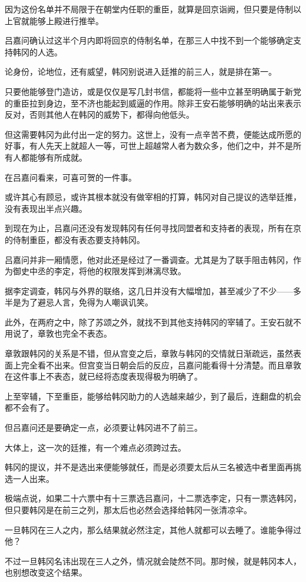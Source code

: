 因为这份名单并不局限于在朝堂内任职的重臣，就算是回京诣阙，但只要是侍制以上官就能够上殿进行推举。

吕嘉问确认过这半个月内即将回京的侍制名单，在那三人中找不到一个能够确定支持韩冈的人选。

论身份，论地位，还有威望，韩冈别说进入廷推的前三人，就是排在第一。

只要他能够登门造访，或是仅仅是写几封书信，都能将一些中立甚至明确属于新党的重臣拉到身边，至不济也能起到威逼的作用。除非王安石能够明确的站出来表示反对，否则其他人在韩冈的威势下，都得向他低头。

但这需要韩冈为此付出一定的努力。这世上，没有一点辛苦不费，便能达成所愿的好事，有人先天上就超人一等，可世上超越常人者为数众多，他们之中，并不是所有人都能够有所成就。

在吕嘉问看来，可喜可贺的一件事。

或许其心有顾忌，或许其根本就没有做宰相的打算，韩冈对自己提议的选举廷推，没有表现出半点兴趣。

到现在为止，吕嘉问还没有发现韩冈有任何寻找同盟者和支持者的表现，所有在京的侍制重臣，都没有表态要支持韩冈。

吕嘉问并非一厢情愿，他对此还是经过了一番调查。尤其是为了联手阻击韩冈，作为御史中丞的李定，将他的权限发挥到淋漓尽致。

据李定调查，韩冈与外界的联络，这几日并没有大幅增加，甚至减少了不少——多半是为了避忌人言，免得为人嘲讽讥笑。

此外，在两府之中，除了苏颂之外，就找不到其他支持韩冈的宰辅了。王安石就不用说了，章敦也完全不表态。

章敦跟韩冈的关系是不错，但从宫变之后，章敦与韩冈的交情就日渐疏远，虽然表面上完全看不出来。但宫变当日朝会后的反应，吕嘉问能看得十分清楚。而且章敦在这件事上不表态，就已经将态度表现得极为明确了。

上至宰辅，下至重臣，能够给韩冈助力的人选越来越少，到了最后，连翻盘的机会都不会有了。

但吕嘉问还是要确定一点，必须要让韩冈进不了前三。

大体上，这一次的廷推，有一个难点必须跨过去。

韩冈的提议，并不是选出来便能够就任，而是必须要太后从三名被选中者里面再挑选一人出来。

极端点说，如果二十六票中有十三票选吕嘉问，十二票选李定，只有一票选韩冈，但只要韩冈是在前三之列，那太后也必然会选择给韩冈一张清凉伞。

一旦韩冈在三人之内，那么结果就必然注定，其他人就都可以去睡了。谁能争得过他？

不过一旦韩冈名讳出现在三人之外，情况就会陡然不同。那时候，就是韩冈本人，也别想改变这个结果。

